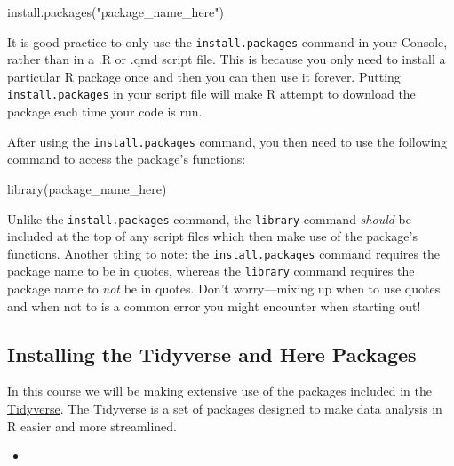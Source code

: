 \documentclass[
  letterpaper,
]{book}
\newenvironment{Shaded}{\begin{snugshade}}{\end{snugshade}}
\newcommand{\FunctionTok}[1]{\textcolor[rgb]{0.28,0.35,0.67}{#1}}
\newcommand{\NormalTok}[1]{\textcolor[rgb]{0.00,0.23,0.31}{#1}}
\newcommand{\StringTok}[1]{\textcolor[rgb]{0.13,0.47,0.30}{#1}}
\providecommand{\tightlist}{%
  \setlength{\itemsep}{0pt}\setlength{\parskip}{0pt}}\usepackage{longtable,booktabs,array}
\theoremstyle{definition}
\theoremstyle{definition}
\theoremstyle{plain}
\theoremstyle{definition}
\theoremstyle{plain}
\theoremstyle{plain}
\theoremstyle{remark}
\begin{document}
\begin{Shaded}
\begin{Highlighting}[]
\FunctionTok{install.packages}\NormalTok{(}\StringTok{"package\_name\_here"}\NormalTok{)}
\end{Highlighting}
\end{Shaded}

It is good practice to only use the \texttt{install.packages} command in
your Console, rather than in a .R or .qmd script file. This is because
you only need to install a particular R package once and then you can
then use it forever. Putting \texttt{install.packages} in your script
file will make R attempt to download the package each time your code is
run.

After using the \texttt{install.packages} command, you then need to use
the following command to access the package's functions:

\begin{Shaded}
\begin{Highlighting}[]
\FunctionTok{library}\NormalTok{(package\_name\_here)}
\end{Highlighting}
\end{Shaded}

Unlike the \texttt{install.packages} command, the \texttt{library}
command \emph{should} be included at the top of any script files which
then make use of the package's functions. Another thing to note: the
\texttt{install.packages} command requires the package name to be in
quotes, whereas the \texttt{library} command requires the package name
to \emph{not} be in quotes. Don't worry---mixing up when to use quotes
and when not to is a common error you might encounter when starting out!

\hypertarget{installing-the-tidyverse-and-here-packages}{%
\subsection{Installing the Tidyverse and Here
Packages}\label{installing-the-tidyverse-and-here-packages}}

In this course we will be making extensive use of the packages included
in the \href{https://www.tidyverse.org/}{Tidyverse}. The Tidyverse is a
set of packages designed to make data analysis in R easier and more
streamlined.

\begin{itemize}
\tightlist
\item
\end{itemize}
\end{document}
